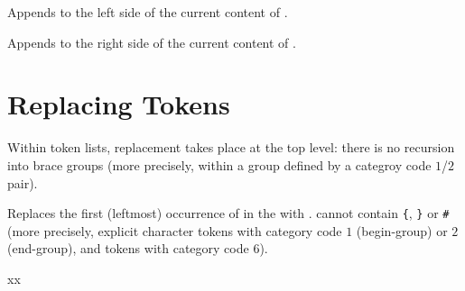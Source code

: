 \documentclass[oneside]{book}
\begin{document}
\begin{function}{\tlPutLeft}
\begin{syntax}
  
\end{syntax}
Appends  to the left side of the current content of .
\begin{demohigh}
\tlSet {}
\tlPutLeft {}
\tlUse \lTmpkTl
\end{demohigh}
\end{function}

\begin{function}{\tlPutRight}
\begin{syntax}
  
\end{syntax}
Appends  to the right side of the current content of .
\begin{demohigh}
\tlSet {}
\tlPutRight {}
\tlUse \lTmpkTl
\end{demohigh}
\end{function}

\section{Replacing Tokens}

Within token lists, replacement takes place at the top level: there is
no recursion into brace groups (more precisely, within a group defined by
a categroy code $1$/$2$ pair).

\begin{function}{\tlVarReplaceOnce}
\begin{syntax}
   
\end{syntax}
Replaces the first (leftmost) occurrence of  in the
 with . 
cannot contain \verb|{|, \verb|}| or \verb|#|
(more precisely, explicit character tokens with category code $1$
(begin-group) or $2$ (end-group), and tokens with category code $6$).
\begin{demohigh}
\tlSet {}
\tlVarReplaceOnce {} {xx}
\tlUse \lTmpaTl
\end{demohigh}
\end{function}
\end{document}

